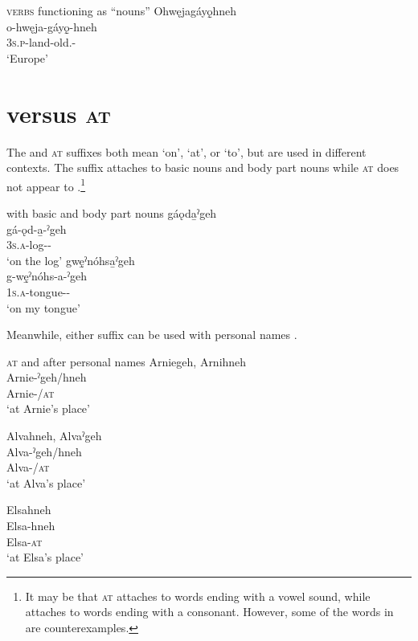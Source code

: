 \ea\label{ex:locex9} \textsc{verbs} functioning as “nouns”
\ea Ohwęjagáyǫ̱hneh\\
\gll o-hwęja-gáyǫ̱-hneh\\
 \textsc{3s.p}-land-old.{\stative}-\\
\glt `Europe'
\z
\z

\section{ {\on} versus  \textsc{at}} \label{-ˀgeh versus -hneh}
The  {\on} and  \textsc{at} suffixes both mean ‘on’, ‘at’, or ‘to’, but are used in different contexts. The  {\on} suffix attaches to basic nouns and body part nouns  while  \textsc{at} does not appear to .\footnote{It may be that  \textsc{at} attaches to words ending with a vowel sound, while  {\on} attaches to words ending with a consonant. However, some of the words in  are counterexamples.}

\newpage
\ea\label{ex:gehneh6}  {\on} with basic and body part nouns
\ea gáǫda̱ˀgeh\\
\gll gá-ǫd-a̱-ˀgeh\\
 \textsc{3s.a}-log-{\joinerA}-{\on}\\
\glt `on the log'
\ex gwę̱ˀnóhsa̱ˀgeh\\
\gll g-wę̱ˀnóhs-a-ˀgeh\\
 \textsc{1s.a}-tongue-{\joinerA}-{\on}\\
\glt `on my tongue'
\z
\z

Meanwhile, either suffix can be used with personal names .

\ea\label{ex:gehneh}  \textsc{at} and  {\on} after personal names
\ea Arniegeh, Arnihneh \\
\gll Arnie-ˀgeh/hneh \\
Arnie-\textsc{\on/at}\\
\glt ‘at Arnie’s place’


\ex Alvahneh, Alvaˀgeh\\
\gll Alva-ˀgeh/hneh\\
Alva-\textsc{\on/at}\\
\glt ‘at Alva’s place’

\ex Elsahneh\\
\gll Elsa-hneh \\
Elsa-\textsc{at}\\
\glt ‘at Elsa’s place’

